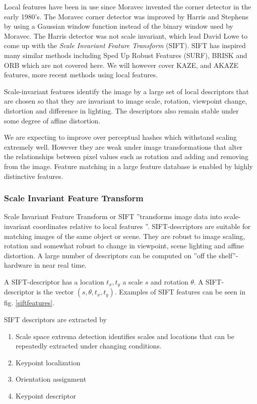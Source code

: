 \documentclass[english,12pt,a4paper,pdftex,elec,utf8]{aaltothesis}
\begin{document}
Local features have been in use since Moravec invented the corner detector in the early 1980's. The Moravec corner detector was improved by Harris and Stephens by using a Gaussian window function instead of the binary window used by Moravec. The Harris detector was not scale invariant, which lead David Lowe to come up with the \emph{Scale Invariant Feature Transform} (SIFT). SIFT has inspired many similar methods including Sped Up Robust Features (SURF), BRISK and ORB which are not covered here. We will however cover KAZE, and AKAZE features, more recent methods using local features.

Scale-invariant features identify the image by a large set of local descriptors that are chosen so that they are invariant to image scale, rotation, viewpoint change, distortion and difference in lighting. The descriptors also remain stable under some degree of affine distortion. \cite{Lowe2004}

We are expecting to improve over perceptual hashes which withstand scaling extremely well. However they are weak under image transformations that alter the relationships between pixel values such as rotation and adding and removing from the image. Feature matching in a large feature database is enabled by highly distinctive features.

\subsubsection{Scale Invariant Feature Transform} \label{SIFTSection}
Scale Invariant Feature Transform or SIFT ''transforms image data into scale-invariant coordinates relative to local features \cite{Lowe2004}''. SIFT-descriptors are suitable for matching images of the same object or scene. They are robust to image scaling, rotation and somewhat robust to change in viewpoint, scene lighting and affine distortion. A large number of descriptors can be computed on ''off the shelf''-hardware in near real time. \cite{Lowe2004}

A SIFT-descriptor has a location $t_x, t_y$ a scale $s$ and rotation $\theta$. A SIFT-descriptor is the vector $(s, \theta, t_x, t_y)$. Examples of SIFT features can be seen in fig. \ref{siftfeatures}.

SIFT descriptors are extracted by

\begin{enumerate}
\item Scale space extrema detection identifies scales and locations that can be repeatedly extracted under changing conditions.
\item Keypoint localization
\item Orientation assignment
\item Keypoint descriptor
\end{enumerate}
\cite{Lowe2004}
\end{document}
